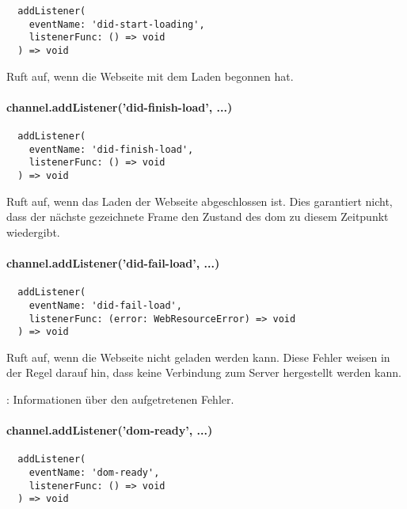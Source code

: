 \begin{verbatim}
  addListener(
    eventName: 'did-start-loading',
    listenerFunc: () => void
  ) => void
\end{verbatim}

Ruft  auf, wenn die Webseite mit dem Laden begonnen hat.


\paragraph{channel.addListener('did-finish-load', ...)}

\begin{verbatim}
  addListener(
    eventName: 'did-finish-load',
    listenerFunc: () => void
  ) => void
\end{verbatim}

Ruft  auf, wenn das Laden der Webseite abgeschlossen ist.
Dies garantiert nicht, dass der nächste gezeichnete Frame den Zustand des \ac{dom} zu diesem Zeitpunkt wiedergibt.


\paragraph{channel.addListener('did-fail-load', ...)}

\begin{verbatim}
  addListener(
    eventName: 'did-fail-load',
    listenerFunc: (error: WebResourceError) => void
  ) => void
\end{verbatim}

Ruft  auf, wenn die Webseite nicht geladen werden kann.
Diese Fehler weisen in der Regel darauf hin, dass keine Verbindung zum Server hergestellt werden kann.

\begin{arguments}
  \item {}: Informationen über den aufgetretenen Fehler.
\end{arguments}


\paragraph{channel.addListener('dom-ready', ...)}

\begin{verbatim}
  addListener(
    eventName: 'dom-ready',
    listenerFunc: () => void
  ) => void
\end{verbatim}

